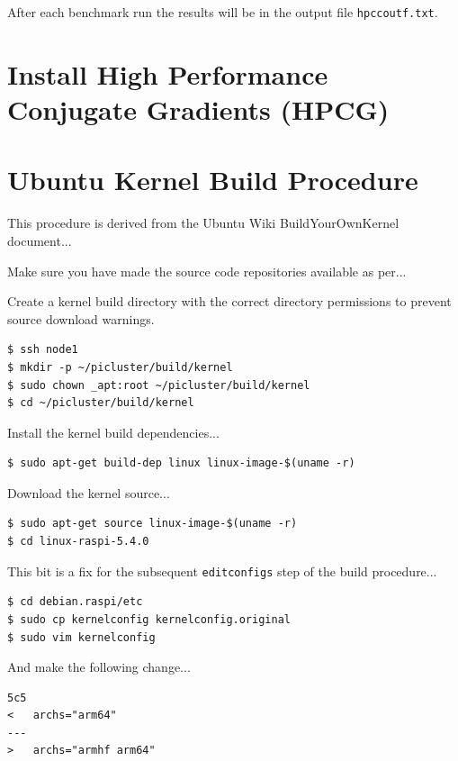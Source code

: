 \documentclass{report}
\begin{document}
After each benchmark run the results will be in the output file \verb|hpccoutf.txt|.



%
%
\chapter{Install High Performance Conjugate Gradients (HPCG)}


%
%
\chapter{Ubuntu Kernel Build Procedure}

This procedure is derived from the Ubuntu Wiki BuildYourOwnKernel document...

Make sure you have made the source code repositories available as per...

Create a kernel build directory with the correct directory permissions to prevent source download warnings. 

\lstset{style=type}
\begin{lstlisting}
$ ssh node1
$ mkdir -p ~/picluster/build/kernel
$ sudo chown _apt:root ~/picluster/build/kernel
$ cd ~/picluster/build/kernel
\end{lstlisting}

Install the kernel build dependencies...

\lstset{style=type}
\begin{lstlisting}
$ sudo apt-get build-dep linux linux-image-$(uname -r)
\end{lstlisting}

Download the kernel source...

\lstset{style=type}
\begin{lstlisting}
$ sudo apt-get source linux-image-$(uname -r)
$ cd linux-raspi-5.4.0
\end{lstlisting}

This bit is a fix for the subsequent \verb|editconfigs| step of the build procedure...

\lstset{style=type}
\begin{lstlisting}
$ cd debian.raspi/etc
$ sudo cp kernelconfig kernelconfig.original
$ sudo vim kernelconfig
\end{lstlisting}

And make the following change...

\lstset{style=listing}
\begin{lstlisting}[caption=diff kernelconfig kernelconfig.original, numbers=none]
5c5
< 	archs="arm64"
---
> 	archs="armhf arm64"
\end{lstlisting}
\end{document}
